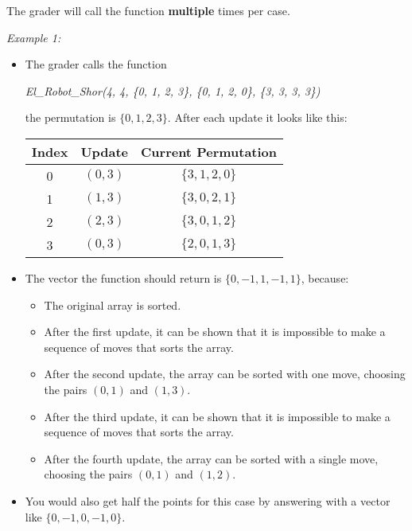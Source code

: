 \documentclass[12pt]{scrartcl}
\begin{document}
    The grader will call the function \textbf{multiple} times per case.
    

        {\itshape Example 1:}
        \begin{itemize}
            \item The grader calls the function 
            \begin{center}
                \textit{El\_Robot\_Shor(4, 4, \{0, 1, 2, 3\}, \{0, 1, 2, 0\}, \{3, 3, 3, 3\})}
            \end{center}
            
            the permutation is $\{0, 1, 2, 3\}$. After each update it looks like this:
            \begin{center}
                \begin{tabular}{|c|c|c|}
                    \hline
                    Index & Update & Current Permutation \\
                    \hline
                    \hline
                     0 & $(0, 3)$ &  $\{3, 1, 2, 0\}$ \\
                     \hline
                     1 & $(1, 3)$ & $\{3, 0, 2, 1\}$ \\
                     \hline
                     2 & $(2, 3)$ & $\{3, 0, 1, 2\}$ \\
                     \hline
                     3 & $(0, 3)$ & $\{2, 0, 1, 3\}$ \\
                     \hline
                \end{tabular}
            \end{center}
            \item The vector the function should return is $\{0, -1, 1 , -1, 1\}$, because:
            \begin{itemize}
                \item  The original array is sorted.
                \item  After the first update, it can be shown that it is impossible to make a sequence of moves that sorts the array.
                \item After the second update, the array can be sorted with one move, choosing the pairs $(0, 1)$ and $(1, 3)$.
                \item  After the third update, it can be shown that it is impossible to make a sequence of moves that sorts the array.
                \item After the fourth update, the array can be sorted with a single move, choosing the pairs $(0, 1)$ and $(1, 2)$.
            \end{itemize}
            \item You would also get half the points for this case by answering with a vector like $\{0, -1, 0, -1, 0\}$.
        \end{itemize}
        
\end{document}
